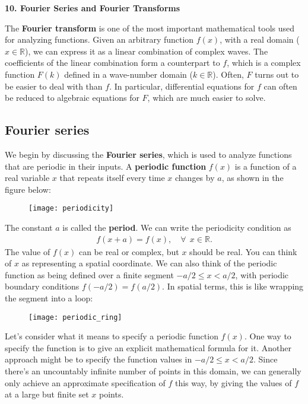 \documentclass[10pt,a4paper]{article}
\begin{document}
\setcounter{page}{75}

\noindent
{\Large \textbf{10. Fourier Series and Fourier Transforms}}
\vskip 0.2in

\label{fourier-series-and-fourier-transforms}

The \textbf{Fourier transform} is one of the most important
mathematical tools used for analyzing functions.  Given an arbitrary
function $f(x)$, with a real domain ($x \in \mathbb{R}$), we can
express it as a linear combination of complex waves.  The coefficients
of the linear combination form a counterpart to $f$, which is a
complex function $F(k)$ defined in a wave-number domain ($k \in
\mathbb{R}$). Often, $F$ turns out to be easier to deal with than
$f$. In particular, differential equations for $f$ can often be
reduced to algebraic equations for $F$, which are much easier to
solve.

\subsection{Fourier series}
\label{fourier-series}

We begin by discussing the \textbf{Fourier series}, which is used to
analyze functions that are periodic in their inputs.  A
\textbf{periodic function} $f(x)$ is a function of a real variable $x$
that repeats itself every time $x$ changes by $a$, as shown in the
figure below:

\begin{figure}[ht]
  \centering\texttt{[image: periodicity]}
\end{figure}

The constant $a$ is called the \textbf{period}.  We can write the
periodicity condition as
\begin{align}
  f(x+a) = f(x), \quad\forall\;\, x\in \mathbb{R}.
\end{align}
The value of $f(x)$ can be real or complex, but $x$ should be real.
You can think of $x$ as representing a spatial coordinate. We can also
think of the periodic function as being defined over a finite segment
$-a/2 \le x < a/2$, with periodic boundary conditions $f(-a/2) =
f(a/2)$. In spatial terms, this is like wrapping the segment into a
loop:

\begin{figure}[ht]
  \centering\texttt{[image: periodic\_ring]}
\end{figure}

Let's consider what it means to specify a periodic function
$f(x)$. One way to specify the function is to give an explicit
mathematical formula for it. Another approach might be to specify the
function values in $-a/2 \le x < a/2$. Since there's an uncountably
infinite number of points in this domain, we can generally only
achieve an approximate specification of $f$ this way, by giving the
values of $f$ at a large but finite set $x$ points.
\end{document}
